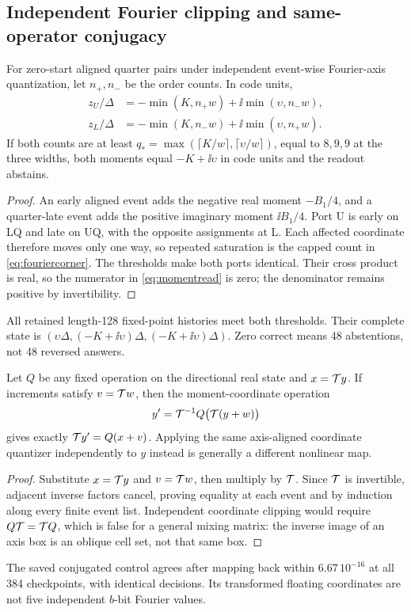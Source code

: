 \subsection{Independent Fourier clipping and same-operator conjugacy}
\begin{theorem}\label{thm:fouriercorner}
For zero-start aligned quarter pairs under independent event-wise Fourier-axis quantization, let $n_+,n_-$ be the order counts. In code units,
\begin{equation}\label{eq:fouriercorner}
 \begin{aligned}
 z_U/\Delta&=-\min(K,n_+w)+\ii\min(\upsilon,n_-w),\\
 z_L/\Delta&=-\min(K,n_-w)+\ii\min(\upsilon,n_+w).
 \end{aligned}
\end{equation}
If both counts are at least $q_*=\max(\lceil K/w\rceil,\lceil\upsilon/w\rceil)$, equal to $8,9,9$ at the three widths, both moments equal $-K+\ii\upsilon$ in code units and the readout abstains.
\end{theorem}
\begin{proof}
An early aligned event adds the negative real moment $-B_1/4$, and a quarter-late event adds the positive imaginary moment $\ii B_1/4$. Port U is early on LQ and late on UQ, with the opposite assignments at L. Each affected coordinate therefore moves only one way, so repeated saturation is the capped count in \eqref{eq:fouriercorner}. The thresholds make both ports identical. Their cross product is real, so the numerator in \eqref{eq:momentread} is zero; the denominator remains positive by invertibility.
\end{proof}
All retained length-128 fixed-point histories meet both thresholds. Their complete state is $(\upsilon\Delta,(-K+\ii\upsilon)\Delta,(-K+\ii\upsilon)\Delta)$. Zero correct means 48 abstentions, not 48 reversed answers.

\begin{theorem}\label{thm:conjugacy}
Let $Q$ be any fixed operation on the directional real state and $x=\mathcal T y$. If increments satisfy $v=\mathcal T w$, then the moment-coordinate operation
\begin{equation}\label{eq:conjugacy}
 y'=\mathcal T^{-1}Q\bigl(\mathcal T(y+w)\bigr)
\end{equation}
gives exactly $\mathcal T y'=Q(x+v)$. Applying the same axis-aligned coordinate quantizer independently to $y$ instead is generally a different nonlinear map.
\end{theorem}
\begin{proof}
Substitute $x=\mathcal T y$ and $v=\mathcal T w$, then multiply by $\mathcal T$. Since $\mathcal T$ is invertible, adjacent inverse factors cancel, proving equality at each event and by induction along every finite event list. Independent coordinate clipping would require $Q\mathcal T=\mathcal T Q$, which is false for a general mixing matrix: the inverse image of an axis box is an oblique cell set, not that same box.
\end{proof}
The saved conjugated control agrees after mapping back within $6.67\,10^{-16}$ at all 384 checkpoints, with identical decisions. Its transformed floating coordinates are not five independent $b$-bit Fourier values.

